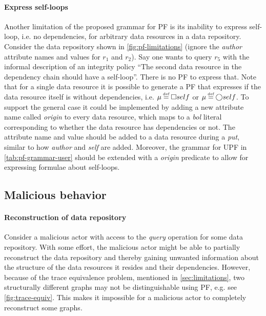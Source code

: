 \paragraph{Express self-loops} Another limitation of the proposed grammar for PF is its inability to express self-loop, i.e. no dependencies, for arbitrary data resources in a data repository. Consider the data repository shown in \autoref{fig:pf-limitations} (ignore the \emph{author} attribute names and values for $r_1$ and $r_2$). Say one wants to query $r_5$ with the informal description of an integrity policy ``The second data resource in the dependency chain should have a self-loop''. There is no PF to express that. Note that for a single data resource it is possible to generate a PF that expresses if the data resource itself is without dependencies, i.e. $\inte \eqdef \G self$ or $\inte \eqdef \X self$. To support the general case it could be implemented by adding a new attribute name called \emph{origin} to every data resource, which maps to a \emph{bol} literal corresponding to whether the data resource has dependencies or not. The attribute name and value should be added to a data resource during a \emph{put}, similar to how \emph{author} and \emph{self} are added. Moreover, the grammar for UPF in \autoref{tab:pf-grammar-user} should be extended with a \emph{origin} predicate to allow for expressing formulae about self-loops.

\subsection{Malicious behavior}
\paragraph{Reconstruction of data repository}
Consider a malicious actor with access to the \emph{query} operation for some data repository. With some effort, the malicious actor might be able to partially reconstruct the data repository and thereby gaining unwanted information about the structure of the data resources it resides and their dependencies. However, because of the trace equivalence problem, mentioned in \autoref{sec:limitations}, two structurally different graphs may not be distinguishable using PF, e.g. see \autoref{fig:trace-equiv}. This makes it impossible for a malicious actor to completely reconstruct some graphs.

